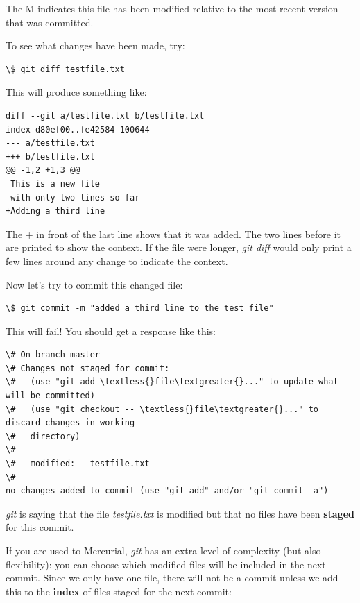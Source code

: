 \documentclass[letterpaper,10pt,english]{sphinxmanual}
\begin{document}
\begin{enumerate}
The M indicates this file has been modified relative to the most recent
version that was committed.

To see what changes have been made, try:

\begin{Verbatim}[commandchars=\\\{\}]
\$ git diff testfile.txt
\end{Verbatim}

This will produce something like:

\begin{Verbatim}[commandchars=\\\{\}]
diff --git a/testfile.txt b/testfile.txt
index d80ef00..fe42584 100644
--- a/testfile.txt
+++ b/testfile.txt
@@ -1,2 +1,3 @@
 This is a new file
 with only two lines so far
+Adding a third line
\end{Verbatim}

The + in front of the last line shows that it was added.
The two lines before it are printed to show the context.  If the
file were longer, \emph{git diff}
would only print a few lines around any change to indicate the context.

Now let's try to commit this changed file:

\begin{Verbatim}[commandchars=\\\{\}]
\$ git commit -m "added a third line to the test file"
\end{Verbatim}

This will fail!  You should get a response like this:

\begin{Verbatim}[commandchars=\\\{\}]
\# On branch master
\# Changes not staged for commit:
\#   (use "git add \textless{}file\textgreater{}..." to update what will be committed)
\#   (use "git checkout -- \textless{}file\textgreater{}..." to discard changes in working
\#   directory)
\#
\#   modified:   testfile.txt
\#
no changes added to commit (use "git add" and/or "git commit -a")
\end{Verbatim}

\emph{git} is saying that the file \emph{testfile.txt} is modified but that no
files have been \textbf{staged} for this commit.

If you are used to Mercurial, \emph{git} has an extra level of complexity (but
also flexibility):  you can choose which modified files will be included
in the next commit.  Since we only have one file, there will not be a
commit unless we add this to the \textbf{index} of files staged for the next
commit:


\end{enumerate}
\end{document}
